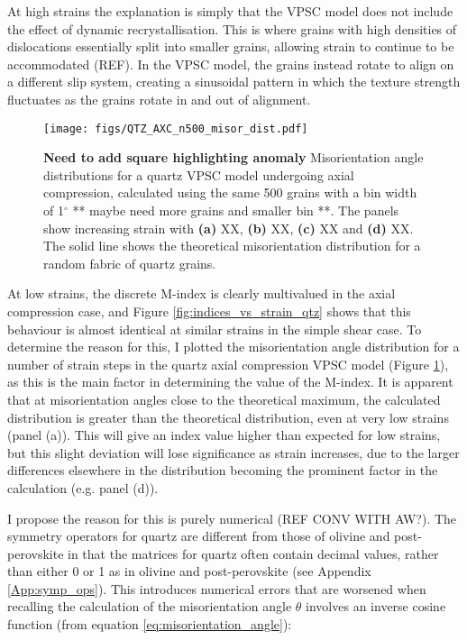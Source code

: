 \documentclass[a4paper,12pt,twoside]{report}
\numberwithin{equation}{chapter}
\begin{document}
At high strains the explanation is simply that the VPSC model does not include the effect of dynamic recrystallisation. This is where grains with high densities of dislocations essentially split into smaller grains, allowing strain to continue to be accommodated (REF). In the VPSC model, the grains instead rotate to align on a different slip system, creating a sinusoidal pattern in which the texture strength fluctuates as the grains rotate in and out of alignment.   


\begin{figure}[t]
  \centering
    \texttt{[image: figs/QTZ\_AXC\_n500\_misor\_dist.pdf]}
  \caption[Misorientation angle distribution (quartz VPSC)]{\textbf{Need to add square highlighting anomaly} Misorientation angle distributions for a quartz VPSC model undergoing axial compression, calculated using the same 500 grains with a bin width of 1$^{\circ}$ ** maybe need more grains and smaller bin **. The panels show increasing strain with \textbf{(a)} XX, \textbf{(b)} XX, \textbf{(c)} XX and \textbf{(d)} XX. The solid line shows the theoretical misorientation distribution for a random fabric of quartz grains.} 
  \label{fig:qtz_misorientation_dist}
\end{figure} 

At low strains, the discrete M-index is clearly multivalued in the axial compression case, and Figure \ref{fig:indices_vs_strain_qtz} shows that this behaviour is almost identical at similar strains in the simple shear case. To determine the reason for this, I plotted the misorientation angle distribution for a number of strain steps in the quartz axial compression VPSC model (Figure \ref{fig:qtz_misorientation_dist}), as this is the main factor in determining the value of the M-index. It is apparent that at misorientation angles close to the theoretical maximum, the calculated distribution is greater than the theoretical distribution, even at very low strains (panel (a)). This will give an index value higher than expected for low strains, but this slight deviation will lose significance as strain increases, due to the larger differences elsewhere in the distribution becoming the prominent factor in the calculation (e.g. panel (d)).

I propose the reason for this is purely numerical (REF CONV WITH AW?). The symmetry operators for quartz are different from those of olivine and post-perovskite in that the matrices for quartz often contain decimal values, rather than either 0 or 1 as in olivine and post-perovskite (see Appendix \ref{App:symp_ops}). This introduces numerical errors that are worsened when recalling the calculation of the misorientation angle $\theta$ involves an inverse cosine function (from equation \ref{eq:misorientation_angle}):   
\end{document}
